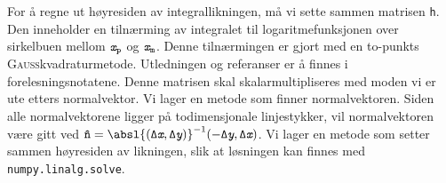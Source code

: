 For å regne ut høyresiden av integrallikningen, må vi sette sammen matrisen \texttt{h}.
Den inneholder en tilnærming av integralet til logaritmefunksjonen over sirkelbuen mellom $\textit{\texttt{x}}_{\mathtt{p}}$ og $\textit{\texttt{x}}_{\mathtt{m}}$.
Denne tilnærmingen er gjort med en to-punkts \textsc{Gauss}kvadraturmetode.
Utledningen og referanser er å finnes i forelesningsnotatene.
Denne matrisen skal skalarmultipliseres med moden vi er ute etters normalvektor.
Vi lager en metode som finner normalvektoren.
Siden alle normalvektorene ligger på todimensjonale linjestykker, vil normalvektoren være gitt ved $\mathtt{\hat{n}} = \absl{(\mathtt{\Delta} \xtt, \mathtt{\Delta} \ytt)}^{-1}(-\mathtt{\Delta}\textit{\texttt{y}}, \mathtt{\Delta}\textit{\texttt{x}})$.
Vi lager en metode som setter sammen høyresiden av likningen, slik at løsningen kan finnes med \texttt{numpy.linalg.solve}.

